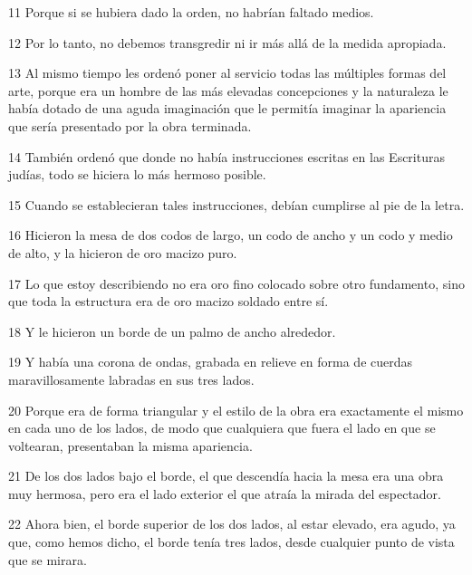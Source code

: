 \par 11 Porque si se hubiera dado la orden, no habrían faltado medios.

\par 12 Por lo tanto, no debemos transgredir ni ir más allá de la medida apropiada.

\par 13 Al mismo tiempo les ordenó poner al servicio todas las múltiples formas del arte, porque era un hombre de las más elevadas concepciones y la naturaleza le había dotado de una aguda imaginación que le permitía imaginar la apariencia que sería presentado por la obra terminada.

\par 14 También ordenó que donde no había instrucciones escritas en las Escrituras judías, todo se hiciera lo más hermoso posible.

\par 15 Cuando se establecieran tales instrucciones, debían cumplirse al pie de la letra.

\par 16 Hicieron la mesa de dos codos de largo, un codo de ancho y un codo y medio de alto, y la hicieron de oro macizo puro.

\par 17 Lo que estoy describiendo no era oro fino colocado sobre otro fundamento, sino que toda la estructura era de oro macizo soldado entre sí.

\par 18 Y le hicieron un borde de un palmo de ancho alrededor.

\par 19 Y había una corona de ondas, grabada en relieve en forma de cuerdas maravillosamente labradas en sus tres lados.

\par 20 Porque era de forma triangular y el estilo de la obra era exactamente el mismo en cada uno de los lados, de modo que cualquiera que fuera el lado en que se voltearan, presentaban la misma apariencia.

\par 21 De los dos lados bajo el borde, el que descendía hacia la mesa era una obra muy hermosa, pero era el lado exterior el que atraía la mirada del espectador.

\par 22 Ahora bien, el borde superior de los dos lados, al estar elevado, era agudo, ya que, como hemos dicho, el borde tenía tres lados, desde cualquier punto de vista que se mirara.

